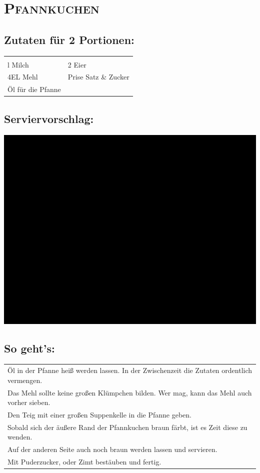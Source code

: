\section{\textsc{Pfannkuchen}}

\subsection*{Zutaten für 2 Portionen:}

\begin{tabular}{p{7.5cm} p{7.5cm}}
	& \\
	\sfrac{1}{4}l Milch & 2 Eier \\
	4EL Mehl & Prise Satz \& Zucker \\
  Öl für die Pfanne
\end{tabular}

\subsection*{Serviervorschlag:}

\includegraphics[width=\textwidth]{img/ph.jpg} \cite{pfannkuchen}

\subsection*{So geht's:}

\begin{tabular}{p{15cm}}
	\\
  Öl in der Pfanne heiß werden lassen. In der Zwischenzeit die Zutaten ordentlich vermengen.\\
  Das Mehl sollte keine großen Klümpchen bilden. Wer mag, kann das Mehl auch vorher sieben.\\
  Den Teig mit einer großen Suppenkelle in die Pfanne geben.\\
  Sobald sich der äußere Rand der Pfannkuchen braun färbt, ist es Zeit diese zu wenden. \\
  Auf der anderen Seite auch noch braun werden lassen und servieren.\\
  Mit Puderzucker, oder Zimt bestäuben und fertig.
\end{tabular}
